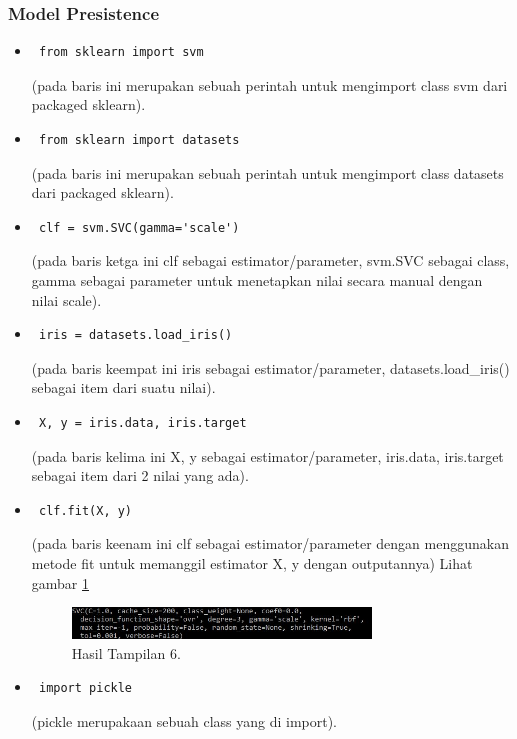 \subsubsection{Model Presistence}
\begin{itemize}
\item\begin{verbatim} from sklearn import svm\end{verbatim}(pada baris ini merupakan sebuah perintah untuk mengimport class svm dari packaged sklearn).
\item\begin{verbatim} from sklearn import datasets\end{verbatim}(pada baris ini merupakan sebuah perintah untuk mengimport class datasets dari packaged sklearn).
\item\begin{verbatim} clf = svm.SVC(gamma='scale')\end{verbatim}(pada baris ketga ini clf sebagai estimator/parameter, svm.SVC sebagai class, gamma sebagai parameter untuk menetapkan nilai secara manual dengan nilai scale).
\item\begin{verbatim} iris = datasets.load_iris()\end{verbatim}(pada baris keempat ini iris sebagai estimator/parameter, datasets.load\_iris() sebagai item dari suatu nilai).
\item\begin{verbatim} X, y = iris.data, iris.target\end{verbatim}(pada baris kelima ini X, y sebagai estimator/parameter, iris.data, iris.target sebagai item dari 2 nilai yang ada).
\item\begin{verbatim} clf.fit(X, y)\end{verbatim}(pada baris keenam ini clf sebagai estimator/parameter dengan menggunakan metode fit untuk memanggil estimator X, y dengan outputannya) Lihat gambar \ref{15}
\begin{figure}[!htbp]\centerline{\includegraphics[width=0.75\textwidth]{figures/huda/15.JPG}}\caption{Hasil Tampilan 6.}\label{15}\end{figure}
\item\begin{verbatim} import pickle\end{verbatim}(pickle merupakaan sebuah class yang di import).

\end{itemize}
